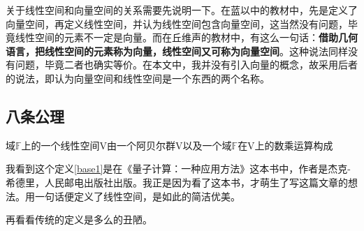 \documentclass[12pt,hyperref,a4paper,UTF8]{ctexart}
\begin{document}
关于线性空间和向量空间的关系需要先说明一下。在蓝以中的教材中，先是定义了向量空间，再定义线性空间，并认为线性空间包含向量空间，这当然没有问题，毕竟线性空间的元素不一定是向量。而在丘维声的教材中，有这么一句话：\textbf{借助几何语言，把线性空间的元素称为向量，线性空间又可称为向量空间}。这种说法同样没有问题，毕竟二者也确实等价。在本文中，我并没有引入向量的概念，故采用后者的说法，即认为向量空间和线性空间是一个东西的两个名称。


\subsection{八条公理}

\begin{Definition}\label{base1}
域$\mathbb{F}$上的一个线性空间V由一个阿贝尔群V以及一个域$\mathbb{F}$在V上的数乘运算构成
\end{Definition}


我看到这个定义\ref{base1}是在《量子计算：一种应用方法》这本书中，作者是杰克-希德里，人民邮电出版社出版。我正是因为看了这本书，才萌生了写这篇文章的想法。用一句话便定义了线性空间，是如此的简洁优美。

再看看传统的定义是多么的丑陋。
\end{document}
